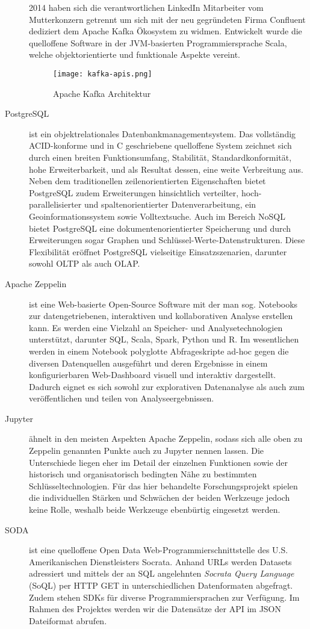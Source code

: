 \begin{description}
	2014 haben sich die verantwortlichen LinkedIn Mitarbeiter vom Mutterkonzern getrennt um sich mit der neu gegründeten Firma Confluent dediziert dem Apache Kafka Ökosystem zu widmen. Entwickelt wurde die quelloffene Software in der JVM-basierten Programmiersprache Scala, welche objektorientierte und funktionale Aspekte vereint.
	\begin{figure}[h]
		\centering
		\texttt{[image: kafka-apis.png]}
		\caption[Apache Kafka Architektur]{Apache Kafka Architektur\citep{TODO}}
		\label{fig:KafkaArchitecture}
	\end{figure}
	\item [PostgreSQL] ist ein objektrelationales Datenbankmanagementsystem. Das vollständig ACID-konforme und in C geschriebene quelloffene System zeichnet sich durch einen breiten Funktionsumfang, Stabilität, Standardkonformität, hohe Erweiterbarkeit, und als Resultat dessen, eine weite Verbreitung aus. Neben dem traditionellen zeilenorientierten  Eigenschaften bietet PostgreSQL zudem Erweiterungen hinsichtlich verteilter, hoch-parallelisierter und  spaltenorientierter Datenverarbeitung, ein Geoinformationssystem sowie Volltextsuche. Auch im Bereich NoSQL bietet PostgreSQL eine dokumentenorientierter Speicherung und durch Erweiterungen sogar Graphen und Schlüssel-Werte-Datenstrukturen. Diese Flexibilität eröffnet PostgreSQL vielseitige Einsatzszenarien, darunter sowohl OLTP als auch OLAP.
	\item [Apache Zeppelin] ist eine Web-basierte Open-Source Software mit der man sog. Notebooks zur datengetriebenen, interaktiven und kollaborativen Analyse erstellen kann. Es werden eine Vielzahl an Speicher- und Analysetechnologien unterstützt, darunter SQL, Scala, Spark, Python und R. Im wesentlichen werden in einem Notebook polyglotte Abfrageskripte ad-hoc gegen die diversen Datenquellen ausgeführt und deren Ergebnisse in einem konfigurierbaren Web-Dashboard visuell und interaktiv dargestellt. Dadurch eignet es sich sowohl zur explorativen Datenanalyse als auch zum veröffentlichen und teilen von Analyseergebnissen.
	\item [Jupyter] ähnelt in den meisten Aspekten Apache Zeppelin, sodass sich alle oben zu Zeppelin genannten Punkte auch zu Jupyter nennen lassen. Die Unterschiede liegen eher im Detail der einzelnen Funktionen sowie der historisch und organisatorisch bedingten Nähe zu bestimmten Schlüsseltechnologien. Für das hier behandelte Forschungsprojekt spielen die individuellen Stärken und Schwächen der beiden Werkzeuge jedoch keine Rolle, weshalb beide Werkzeuge ebenbürtig eingesetzt werden.
	\item[\ac{SODA}] ist eine quelloffene Open Data Web-Programmierschnittstelle des U.S. Amerikanischen Dienstleisters Socrata. Anhand URLs werden Datasets adressiert und mittels der an SQL angelehnten \textit{Socrata Query Language} (SoQL) per HTTP GET in unterschiedlichen Datenformaten abgefragt. Zudem stehen SDKs für diverse Programmiersprachen zur Verfügung. Im Rahmen des Projektes werden wir die Datensätze der \ac{API} im \ac{JSON} Dateiformat abrufen.
\end{description}
